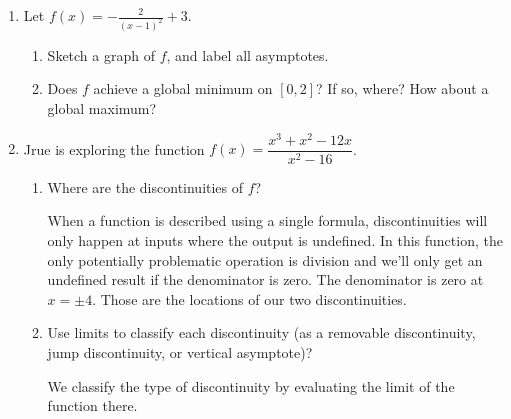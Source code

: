 \documentclass{article}
\begin{document}
\begin{enumerate}
\begin{enumerate}[resume]
\begin{solution}
    Similar reasoning, which compares $\displaystyle \lim_{x\to\infty}f(x)$ to $f(-2)$ confirms $f(-2)$ is a global minimum.
\end{solution}
  

  \end{enumerate}


\item  Let $\displaystyle f(x) = - \frac{2}{(x - 1)^2} + 3$.

  \begin{enumerate}
  \item
    \begin{problem}[\stretch{1.5}]
      Sketch a graph of $f$, and label all asymptotes. 
    \end{problem}

  \item
    \begin{problem}[\vfill]
      Does $f$ achieve a global minimum on $[0, 2]$? If so, where? How about a global maximum? 
    \end{problem}

  \end{enumerate}
\item  \label{fall2023-workshop6-2}

  Jrue is exploring the function $f(x) = \dfrac{x^3 + x^2 - 12 x}{x^2 - 16}$.
  \begin{enumerate}
  \item
    \begin{problem}[1in]
      Where are the discontinuities of $f$? 
    \end{problem}

\begin{solution}
    When a function is described using a single formula, discontinuities will only happen at inputs where the output is undefined. In this function, the only potentially problematic operation is division and we'll only get an undefined result if the denominator is zero. The denominator is zero at $x=\pm 4$. Those are the locations of our two discontinuities. 
\end{solution}
\item
    \begin{problem}[6in]
      Use limits to classify each discontinuity (as a removable discontinuity, jump discontinuity, or vertical asymptote)? 
    \end{problem}

\begin{solution}
    We classify the type of discontinuity by evaluating the limit of the function there.\\
    

\end{solution}
\end{enumerate}
\end{enumerate}
\end{document}
